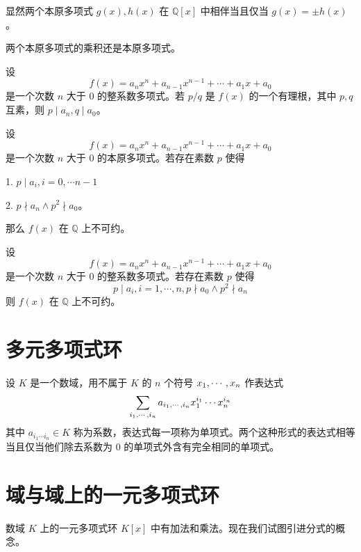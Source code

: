 显然两个本原多项式 $g(x), h(x)$ 在 $\mathbb{Q}[x]$ 中相伴当且仅当 $g(x) = \pm h(x)$。

\begin{theorem}[Gauss 引理]
	两个本原多项式的乘积还是本原多项式。
\end{theorem}

\begin{theorem}
	设
	\[ f(x) = a_nx^n + a_{n-1}x^{n-1} + \cdots + a_1x + a_0\]
	是一个次数 $n$ 大于 $0$ 的整系数多项式。若 $p/q$ 是 $f(x)$ 的一个有理根，其中 $p,q$ 互素，则 $p \mid a_n, q \mid a_0$。
\end{theorem}

\begin{theorem}
	设
	\[ f(x) = a_nx^n + a_{n-1}x^{n-1} + \cdots + a_1x + a_0\]
	是一个次数 $n$ 大于 $0$ 的本原多项式。若存在素数 $p$ 使得
	
	1. $p \mid a_i, i = 0,\cdots n-1$
	
	2. $p \nmid a_n \land p^2 \nmid a_0$。
	
	那么 $f(x)$ 在 $\mathbb{Q}$ 上不可约。
\end{theorem}

\begin{theorem}
	设
	\[ f(x) = a_nx^n + a_{n-1}x^{n-1} + \cdots + a_1x + a_0\]
	是一个次数 $n$ 大于 $0$ 的整系数多项式。若存在素数 $p$ 使得
	\[ p \mid a_i, i = 1,\cdots,n, p \nmid a_0 \land  p^2 \nmid a_n \]
	则 $f(x)$ 在 $\mathbb{Q}$ 上不可约。
\end{theorem}

\section{多元多项式环}

\begin{definition}
	设 $K$ 是一个数域，用不属于 $K$ 的 $n$ 个符号 $x_1,\cdots,x_n$ 作表达式
	\[ \sum_{i_1,\cdots,i_n}a_{i_1,\cdots,i_n} x_1^{i_1}\cdots x_n^{i_n} \]
	其中 $a_{i_1\cdots i_n} \in K$ 称为系数，表达式每一项称为单项式。两个这种形式的表达式相等当且仅当他们除去系数为 $0$ 的单项式外含有完全相同的单项式。
\end{definition}

\section{域与域上的一元多项式环}

数域 $K$ 上的一元多项式环 $K[x]$ 中有加法和乘法。现在我们试图引进分式的概念。


